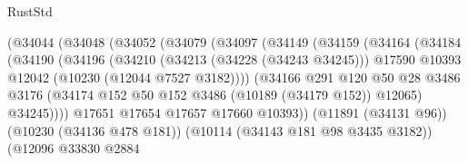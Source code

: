 \begin{lexlean}{RustStd}
\begin{coremodule}
                                  (@34044
                                    (@34048
                                      (@34052
                                        (@34079
                                          (@34097
                                            (@34149
                                              (@34159
                                                (@34164
                                                  (@34184
                                                    (@34190
                                                      (@34196
                                                        (@34210
                                                          (@34213 (@34228 (@34243 @34245)))
                                                          @17590
                                                          @10393
                                                          @12042
                                                          (@10230 (@12044 @7527 @3182))))
                                                      (@34166
                                                        @291
                                                        @120
                                                        @50
                                                        @28
                                                        @3486
                                                        @3176
                                                        (@34174
                                                          @152
                                                          @50
                                                          @152
                                                          @3486
                                                          (@10189 (@34179 @152))
                                                          @12065)
                                                        @34245))))
                                                @17651
                                                @17654
                                                @17657
                                                @17660
                                                @10393))
                                            (@11891 (@34131 @96))
                                            (@10230 (@34136 @478 @181))
                                            (@10114 (@34143 @181 @98 @3435 @3182))
                                            (@12096
                                              @33830
                                              @2884

\end{coremodule}
\end{lexlean}
